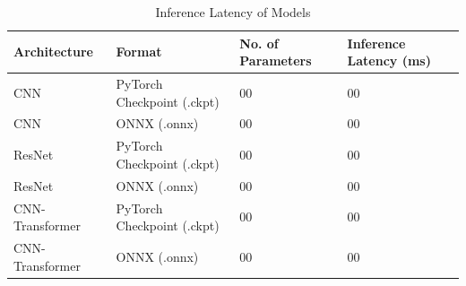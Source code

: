  \begin{table}[ht]
\centering
\begin{tabular}{ l | L | L | L }
    
    Architecture  & 
    Format & 
    No. of Parameters &
    Inference Latency (ms) \\
    \hline
    
    CNN & 
    PyTorch Checkpoint (.ckpt)  & 
    00  &
    00  \\
    
    
    CNN & 
    ONNX (.onnx)  & 
    00  &
    00  \\
    
    ResNet & 
    PyTorch Checkpoint (.ckpt)  & 
    00  &
    00  \\
    
    
    ResNet & 
    ONNX (.onnx)  & 
    00  &
    00  \\
    
    CNN-Transformer & 
    PyTorch Checkpoint (.ckpt)  & 
    00  &
    00  \\
    
    
    CNN-Transformer & 
    ONNX (.onnx)  & 
    00  &
    00  \\
    
    
      
    
    \hline
   
\end{tabular}
    \caption{Inference Latency of Models}
    \label{tab:model_inference}
\end{table} %


